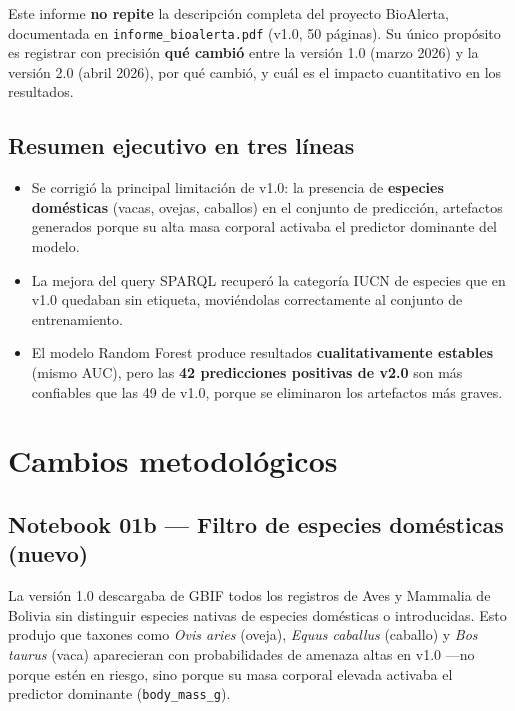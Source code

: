 \documentclass[12pt,a4paper]{article}
\begin{document}
Este informe \textbf{no repite} la descripción completa del proyecto BioAlerta, documentada
en \texttt{informe\_bioalerta.pdf} (v1.0, 50 páginas).
Su único propósito es registrar con precisión \textbf{qué cambió} entre la versión 1.0
(marzo 2026) y la versión 2.0 (abril 2026), por qué cambió, y cuál es el impacto
cuantitativo en los resultados.

\subsection*{Resumen ejecutivo en tres líneas}

\begin{itemize}[nosep]
  \item Se corrigió la principal limitación de v1.0: la presencia de \textbf{especies domésticas}
        (vacas, ovejas, caballos) en el conjunto de predicción, artefactos generados porque su
        alta masa corporal activaba el predictor dominante del modelo.
  \item La mejora del query SPARQL recuperó la categoría IUCN de especies que en v1.0 quedaban
        sin etiqueta, moviéndolas correctamente al conjunto de entrenamiento.
  \item El modelo Random Forest produce resultados \textbf{cualitativamente estables}
        (mismo AUC), pero las \textbf{42 predicciones positivas de v2.0} son más confiables
        que las 49 de v1.0, porque se eliminaron los artefactos más graves.
\end{itemize}

\section{Cambios metodológicos}

\subsection{Notebook 01b --- Filtro de especies domésticas (nuevo)}

La versión 1.0 descargaba de GBIF todos los registros de Aves y Mammalia de Bolivia sin
distinguir especies nativas de especies domésticas o introducidas.
Esto produjo que taxones como \textit{Ovis aries} (oveja), \textit{Equus caballus} (caballo)
y \textit{Bos taurus} (vaca) aparecieran con probabilidades de amenaza altas en v1.0
---no porque estén en riesgo, sino porque su masa corporal elevada activaba el predictor
dominante (\texttt{body\_mass\_g}).
\end{document}
